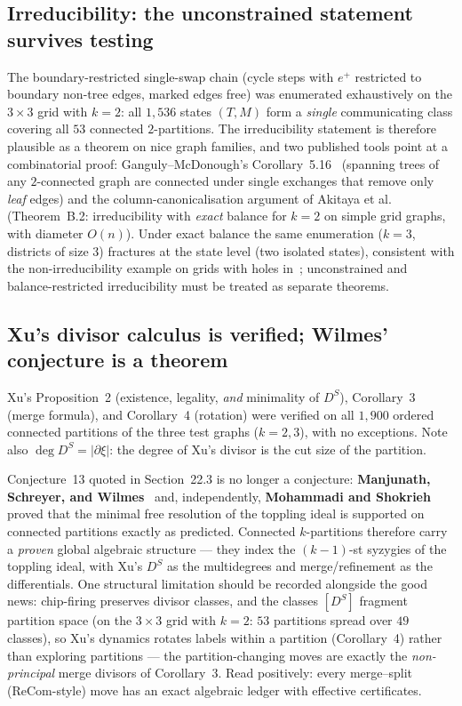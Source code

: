 \documentclass[11pt]{article}
\begin{document}
\subsection{Irreducibility: the unconstrained statement survives testing}

The boundary-restricted single-swap chain (cycle steps with $e^+$ restricted
to boundary non-tree edges, marked edges free) was enumerated exhaustively on
the $3 \times 3$ grid with $k = 2$: all $1{,}536$ states $(T, M)$ form a
\emph{single} communicating class covering all $53$ connected $2$-partitions.
The irreducibility statement is therefore plausible as a theorem on nice
graph families, and two published tools point at a combinatorial proof:
Ganguly--McDonough's Corollary~5.16~\cite{ganguly2023rotor} (spanning trees of
any $2$-connected graph are connected under single exchanges that remove only
\emph{leaf} edges) and the column-canonicalisation argument of Akitaya et
al.~\cite{akitaya2026bud} (Theorem~B.2: irreducibility with \emph{exact}
balance for $k = 2$ on simple grid graphs, with diameter $O(n)$). Under exact
balance the same enumeration ($k = 3$, districts of size $3$) fractures at the
state level (two isolated states), consistent with the non-irreducibility
example on grids with holes in~\cite{akitaya2026bud}; unconstrained and
balance-restricted irreducibility must be treated as separate theorems.

\subsection{Xu's divisor calculus is verified; Wilmes' conjecture is a theorem}

Xu's Proposition~2 (existence, legality, \emph{and} minimality of $D^S$),
Corollary~3 (merge formula), and Corollary~4 (rotation) were verified on all
$1{,}900$ ordered connected partitions of the three test graphs ($k = 2, 3$),
with no exceptions. Note also $\deg D^S = |\partial\xi|$: the degree of Xu's
divisor is the cut size of the partition.

Conjecture~13 quoted in Section~22.3 is no longer a conjecture:
\textbf{Manjunath, Schreyer, and Wilmes}~\cite{manjunath2015minimal} and,
independently, \textbf{Mohammadi and Shokrieh}~\cite{mohammadi2014divisors}
proved that the minimal free resolution of the toppling ideal is supported on
connected partitions exactly as predicted. Connected $k$-partitions therefore
carry a \emph{proven} global algebraic structure --- they index the $(k-1)$-st
syzygies of the toppling ideal, with Xu's $D^S$ as the multidegrees and
merge/refinement as the differentials. One structural limitation should be
recorded alongside the good news: chip-firing preserves divisor classes, and
the classes $[D^S]$ fragment partition space (on the $3 \times 3$ grid with
$k = 2$: $53$ partitions spread over $49$ classes), so Xu's dynamics rotates
labels within a partition (Corollary~4) rather than exploring partitions ---
the partition-changing moves are exactly the \emph{non-principal} merge
divisors of Corollary~3. Read positively: every merge--split (ReCom-style)
move has an exact algebraic ledger with effective certificates.
\end{document}
